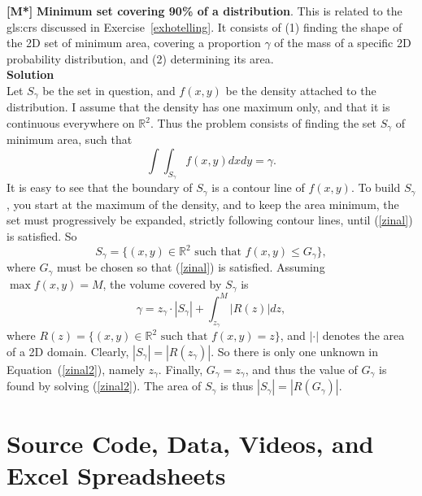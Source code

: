 \documentclass[10pt]{article}
\begin{document}
\begin{Exercise}\label{exercise92}{\bf [M*]} 
 {\bf Minimum set covering 90\% of a distribution}. This is related to the 
\glspl{gls:cr} discussed 
in Exercise~\ref{exhotelling}. It consists of (1) finding the shape of the 2D set of minimum area, covering a 
proportion $\gamma$ of the mass of a specific 2D probability distribution, and (2) determining its area. \vspace{1ex}   \\
{\bf Solution} \vspace{1ex}   \\
Let  $S_\gamma$ be the set in question, and $f(x,y)$ be the density attached to the distribution. I assume 
that the density has one maximum only, and that it is continuous everywhere on $\mathbb{R}^2$. Thus the problem consists of finding 
the set $S_\gamma$ of minimum area, such that
\begin{equation}
\int\int_{S_\gamma} f(x,y) dxdy = \gamma.\label{zinal}
\end{equation}
It is easy to see that the boundary of $S_\gamma$ is a contour line of $f(x,y)$. To build $S_\gamma$, you start at the maximum of the density, and to keep the area minimum, the set must progressively be expanded, strictly following contour lines, until (\ref{zinal}) is satisfied. So 
$$S_\gamma = \{(x, y) \in\mathbb{R}^2 \mbox{ such that } f(x,y)\leq G_\gamma\},$$
where $G_\gamma$ must be chosen so that (\ref{zinal}) is satisfied. Assuming $\max f(x,y)=M$, the volume covered by $S_\gamma$
 is 
\begin{equation}
\gamma = z_\gamma \cdot |S_\gamma| + \int_{z_\gamma}^M |R(z)| dz, \label{zinal2}
\end{equation}
where $R(z) = \{(x, y) \in\mathbb{R}^2 \mbox{ such that } f(x,y) =z\}$, and $|\cdot|$ denotes the area of a 2D domain. Clearly, 
$|S_\gamma|=|R(z_\gamma)|$. So there is only one unknown in Equation~(\ref{zinal2}), namely $z_\gamma$. Finally, $G_\gamma=z_\gamma$, and thus the value of $G_\gamma$ is found by solving (\ref{zinal2}). The area of $S_\gamma$ is
thus $|S_\gamma|=|R(G_\gamma)|$. 
\end{Exercise}

\pagebreak

\section{Source Code, Data, Videos, and Excel Spreadsheets}\label{s:code}
\end{document}
